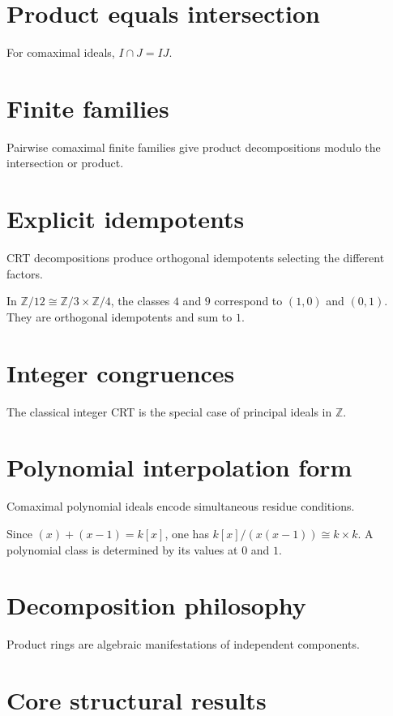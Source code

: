 \section{Product equals intersection}
For comaximal ideals, $I\cap J=IJ$.

\section{Finite families}
Pairwise comaximal finite families give product decompositions modulo the intersection or product.

\section{Explicit idempotents}
CRT decompositions produce orthogonal idempotents selecting the different factors.

\begin{example}\label{ex:v04-expand-02}
In $\mathbb Z/12\cong\mathbb Z/3\times\mathbb Z/4$, the classes $4$ and $9$ correspond to $(1,0)$ and $(0,1)$. They are orthogonal idempotents and sum to $1$.
\end{example}
\section{Integer congruences}
The classical integer CRT is the special case of principal ideals in $\mathbb Z$.

\section{Polynomial interpolation form}
Comaximal polynomial ideals encode simultaneous residue conditions.

\begin{example}\label{ex:v04-expand-03}
Since $(x)+(x-1)=k[x]$, one has $k[x]/(x(x-1))\cong k\times k$. A polynomial class is determined by its values at $0$ and $1$.
\end{example}
\section{Decomposition philosophy}
Product rings are algebraic manifestations of independent components.

\section{Core structural results}


